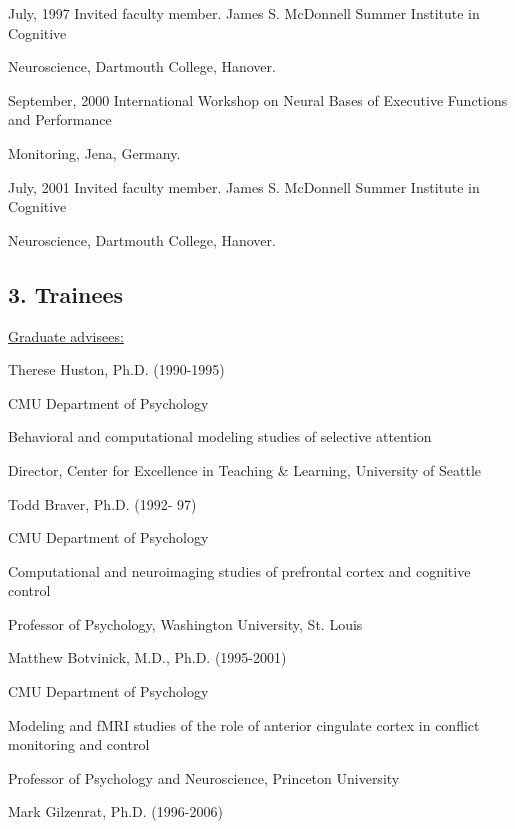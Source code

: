 \documentclass[10 pt]{article}
\begin{document}
July, 1997 \hspace{0.44in} Invited faculty member. James S. McDonnell Summer Institute in Cognitive

\hspace{1.1in} Neuroscience, Dartmouth College, Hanover.

September, 2000 \hspace{0.05in} International Workshop on Neural Bases of Executive Functions and Performance

\hspace{1.1in} Monitoring, Jena, Germany.

July, 2001 \hspace{0.44in} Invited faculty member. James S. McDonnell Summer Institute in Cognitive

\hspace{1.1in} Neuroscience, Dartmouth College, Hanover.
    \smallskip

\subsection*{3. Trainees} \label{secTEACHING3}
    \smallskip

{\fontsize{12pt}{16 pt}\selectfont \underline{Graduate advisees:}}
    \smallskip

Therese Huston, Ph.D. (1990-1995)

CMU Department of Psychology

Behavioral and computational modeling studies of selective attention

Director, Center for Excellence in Teaching \& Learning, University of Seattle
    \medskip

Todd Braver, Ph.D. (1992- 97)

CMU Department of Psychology

Computational and neuroimaging studies of prefrontal cortex and cognitive control

Professor of Psychology, Washington University, St. Louis
    \medskip

Matthew Botvinick, M.D., Ph.D. (1995-2001)

CMU Department of Psychology

Modeling and fMRI studies of the role of anterior cingulate cortex in conflict monitoring and control

Professor of Psychology and Neuroscience, Princeton University
    \medskip

Mark Gilzenrat, Ph.D. (1996-2006)
\end{document}
